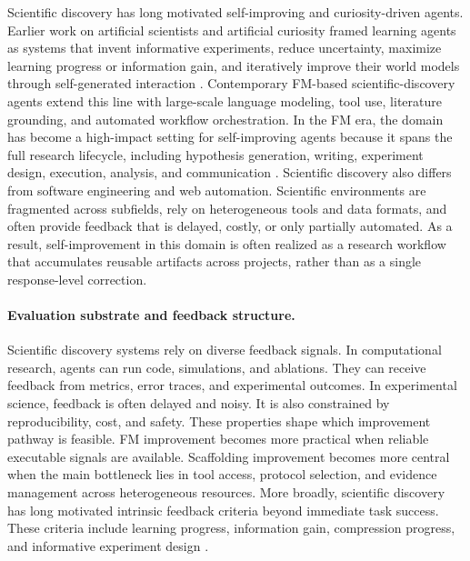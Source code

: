 Scientific discovery has long motivated self-improving and curiosity-driven agents. Earlier work on artificial scientists and artificial curiosity framed learning agents as systems that invent informative experiments, reduce uncertainty, maximize learning progress or information gain, and iteratively improve their world models through self-generated interaction \citep{schmidhuber1990making, schmidhuber1991curious, storck1995reinforcement, schmidhuber1997s, schmidhuber2003exploring, schmidhuber2013powerplay, schmidhuber2015learning}. Contemporary FM-based scientific-discovery agents extend this line with large-scale language modeling, tool use, literature grounding, and automated workflow orchestration. In the FM era, the domain has become a high-impact setting for self-improving agents because it spans the full research lifecycle, including hypothesis generation, writing, experiment design, execution, analysis, and communication \citep{lu2024aiscientistfullyautomated, yamada2025aiscientistv2workshoplevelautomated, xiong2025beyond}.
Scientific discovery also differs from software engineering and web automation. Scientific environments are fragmented across subfields, rely on heterogeneous tools and data formats, and often provide feedback that is delayed, costly, or only partially automated. As a result, self-improvement in this domain is often realized as a research workflow that accumulates reusable artifacts across projects, rather than as a single response-level correction.

\paragraph{Evaluation substrate and feedback structure.}
Scientific discovery systems rely on diverse feedback signals. In computational research, agents can run code, simulations, and ablations. They can receive feedback from metrics, error traces, and experimental outcomes. In experimental science, feedback is often delayed and noisy. It is also constrained by reproducibility, cost, and safety. These properties shape which improvement pathway is feasible. FM improvement becomes more practical when reliable executable signals are available. Scaffolding improvement becomes more central when the main bottleneck lies in tool access, protocol selection, and evidence management across heterogeneous resources. More broadly, scientific discovery has long motivated intrinsic feedback criteria beyond immediate task success. These criteria include learning progress, information gain, compression progress, and informative experiment design \citep{storck1995reinforcement, schmidhuber2007simple, schmidhuber2010formal, schmidhuber2013powerplay}.



